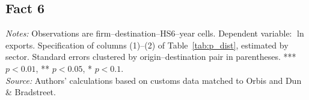 \documentclass[11pt,a4paper]{article}
\begin{document}
\subsection*{Fact 6}
\begin{table}[H]\centering\small%
  \caption{Distance and Firm Exports, by Sector}%
  \label{tab:a_f6sum}%
  \par\vspace{3pt}%
  \begin{minipage}{0.95\textwidth}\footnotesize %
  \textit{Notes:} Observations are firm--destination--HS6--year cells. Dependent variable: $\ln$ exports. Specification of columns (1)--(2) of Table~\ref{tab:p_dist}, estimated by sector. Standard errors clustered by origin--destination pair in parentheses. *** $p<0.01$, ** $p<0.05$, * $p<0.1$.\\[3pt]%
  \textit{Source:} Authors' calculations based on customs data matched to Orbis and Dun \& Bradstreet.%
  \end{minipage}%
  \end{table}
\end{document}
